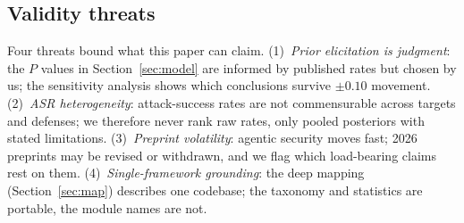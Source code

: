 \subsection{Validity threats}

Four threats bound what this paper can claim. (1)~\emph{Prior elicitation is
judgment}: the $P$ values in Section~\ref{sec:model} are informed by published
rates but chosen by us; the sensitivity analysis shows which conclusions survive
$\pm 0.10$ movement. (2)~\emph{ASR heterogeneity}: attack-success rates are not
commensurable across targets and defenses; we therefore never rank raw rates, only
pooled posteriors with stated limitations. (3)~\emph{Preprint volatility}: agentic
security moves fast; 2026 preprints may be revised or withdrawn, and we flag
which load-bearing claims rest on them. (4)~\emph{Single-framework grounding}: the
deep mapping (Section~\ref{sec:map}) describes one codebase; the taxonomy and
statistics are portable, the module names are not.
